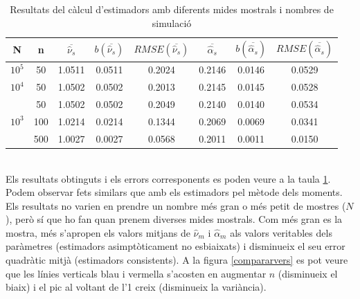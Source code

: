 \documentclass[12pt, catalan]{article}
\numberwithin{table}{section}
\numberwithin{figure}{section}
\numberwithin{equation}{section}
\begin{document}
\begin{table}[h]
\centering
\caption{Resultats del càlcul d'estimadors amb diferents mides mostrals i nombres de simulació}\vspace{0.3cm}
\begin{tabular}{|c|c|c|c|c|c|c|c|}
\hline
N                    & n   & $\overline{\hat{\nu}_s}$& $b(\overline{\hat{\nu}_s})$ & $RMSE(\overline{\hat{\nu}_s})$  & $\overline{\hat{\alpha}_s}$    & $b(\overline{\hat{\alpha}_s})$ & $RMSE(\overline{\hat{\alpha}_s})$ \\ \hline
$10^5$                  & 50  & 1.0511 &0.0511& 0.2024  & 0.2146 &0.0146& 0.0529   \\ \hline
$10^4$                   & 50  & 1.0502 &0.0502& 0.2013  & 0.2145 &0.0145& 0.0528   \\ \hline
\multirow{3}{*}{$10^3$ } & 50  & 1.0502 &0.0502& 0.2049  & 0.2140 &0.0140& 0.0534   \\ \cline{2-8} 
                     & 100 & 1.0214 &0.0214& 0.1344  & 0.2069 &0.0069& 0.0341   \\ \cline{2-8} 
                     & 500 & 1.0027 &0.0027& 0.0568 & 0.2011 &0.0011& 0.0150   \\ \hline
\end{tabular}
\label{nusalphas}
\end{table}
\\
Els resultats obtinguts i els errors corresponents es poden veure a la taula \ref{nusalphas}. Podem observar fets similars que amb els estimadors pel mètode dels moments. Els resultats no varien en prendre un nombre més gran o més petit de mostres ($N$), però sí que ho fan quan prenem diverses mides mostrals. Com més gran es la mostra, més s'apropen els valors mitjans de $\hat{\nu}_m$ i $\hat{\alpha}_m$ als valors veritables dels paràmetres (estimadors asimptòticament no esbiaixats) i disminueix el seu error quadràtic mitjà (estimadors consistents). A la figura \ref{compararvers} es pot veure que les línies verticals blau i vermella s'acosten en augmentar $n$ (disminueix el biaix) i el pic al voltant de l'1 creix (disminueix la variància).
\end{document}
